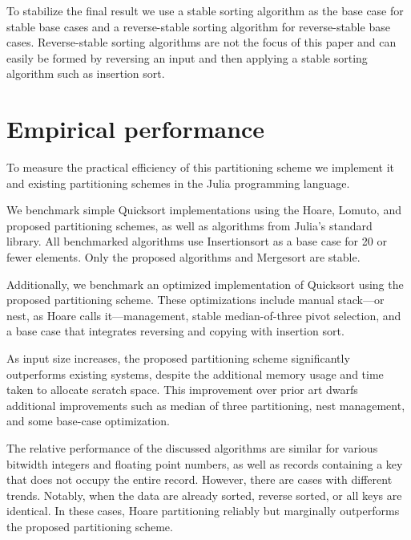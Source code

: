 \documentclass{juliacon}
\begin{document}
To stabilize the final result we use a stable sorting algorithm as the base case for stable base cases and a reverse-stable sorting algorithm for reverse-stable base cases. Reverse-stable sorting algorithms are not the focus of this paper and can easily be formed by reversing an input and then applying a stable sorting algorithm such as insertion sort.

\section{Empirical performance}

To measure the practical efficiency of this partitioning scheme we implement it and existing partitioning schemes in the Julia \cite{julia} programming language.

We benchmark simple Quicksort implementations using the Hoare, Lomuto, and proposed partitioning schemes, as well as algorithms from Julia's standard library. All benchmarked algorithms use Insertionsort as a base case for 20 or fewer elements. Only the proposed algorithms and Mergesort are stable.

Additionally, we benchmark an optimized implementation of Quicksort using the proposed partitioning scheme. These optimizations include manual stack---or nest, as Hoare calls it---management, stable median-of-three pivot selection, and a base case that integrates reversing and copying with insertion sort.

\vspace{8pt}

\scalebox{.5}{}

\vspace{8pt}

As input size increases, the proposed partitioning scheme significantly outperforms existing systems, despite the additional memory usage and time taken to allocate scratch space. This improvement over prior art dwarfs additional improvements such as median of three partitioning, nest management, and some base-case optimization.

The relative performance of the discussed algorithms are similar for various bitwidth integers and floating point numbers, as well as records containing a key that does not occupy the entire record. However, there are cases with different trends. Notably, when the data are already sorted, reverse sorted, or all keys are identical. In these cases, Hoare partitioning reliably but marginally outperforms the proposed partitioning scheme.
\end{document}
